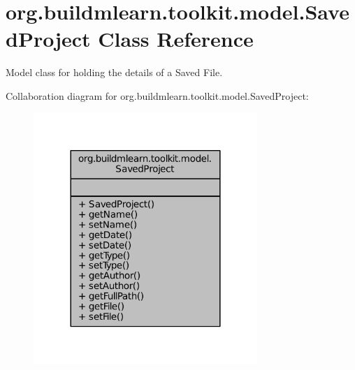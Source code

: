 \hypertarget{classorg_1_1buildmlearn_1_1toolkit_1_1model_1_1SavedProject}{\section{org.\-buildmlearn.\-toolkit.\-model.\-Saved\-Project Class Reference}
\label{classorg_1_1buildmlearn_1_1toolkit_1_1model_1_1SavedProject}
}


Model class for holding the details of a Saved File.  




Collaboration diagram for org.\-buildmlearn.\-toolkit.\-model.\-Saved\-Project\-:
\nopagebreak
\begin{figure}[H]
\begin{center}
\leavevmode
\includegraphics[width=240pt]{d7/d50/classorg_1_1buildmlearn_1_1toolkit_1_1model_1_1SavedProject__coll__graph}
\end{center}
\end{figure}
